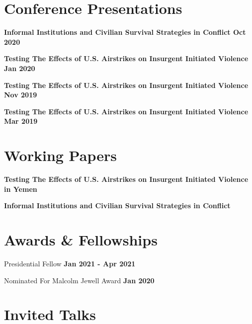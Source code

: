 \documentclass[margin]{res}
\newcommand{\fullhrulefill}{%
  \hspace*{-\sectionwidth}\hrulefill%
  }
\begin{document}
\begin{resume}
\fullhrulefill
\section {Conference Presentations}


\textbf {Informal Institutions and Civilian Survival Strategies in Conflict \hfill{Oct 2020}  \\ }

\textbf {Testing The Effects of U.S. Airstrikes on Insurgent Initiated Violence \hfill{Jan 2020}  \\ }

\textbf {Testing The Effects of U.S. Airstrikes on Insurgent Initiated Violence \hfill{Nov 2019}  \\ }

\textbf {Testing The Effects of U.S. Airstrikes on Insurgent Initiated Violence \hfill{Mar 2019} \\ }

\fullhrulefill
\section{Working Papers}
\textbf {Testing The Effects of U.S. Airstrikes on Insurgent Initiated Violence in Yemen}

\textbf {Informal Institutions and Civilian Survival Strategies in Conflict}


\newpage
\fullhrulefill

\section{Awards \& Fellowships}


Presidential Fellow \hfill{\textbf{Jan 2021 - Apr 2021 }} \\  

Nominated For Malcolm Jewell Award \hfill{\textbf{Jan 2020}} \\



\fullhrulefill

\section{Invited Talks}


\end{resume}
\end{document}
